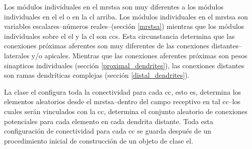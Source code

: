 \begin{figure}[h!]
    \label{fig:EncoderColumnConnections}
\end{figure}

Los módulos individuales en el \gls{mrstsa} son muy diferentes a los módulos individuales en el \gls{el} o en la \gls{cl} arriba. Los módulos individuales en el \gls{mrstsa} son variables escalares--números reales--(sección \ref{mrstsa}) mientras que los módulos individuales sobre el \gls{el} y la \gls{cl} son \glspl{cc}. Esta circunstancia determina que las conexiones próximas aferentes son muy diferentes de las conexiones distantes--laterales y/o apicales. Mientras que las conexiones aferentes próximas son pesos sinapticos individuales (sección \ref{proximal_dendrites}), las conexiones distantes son ramas dendríticas complejas (sección \ref{distal_dendrites}).


La clase \gls{el} configura toda la conectividad para cada \gls{cc}, esto es, determina los elementos aleatorios desde el \gls{mrstsa}--dentro del campo receptivo en tal \gls{cc}--los cuales serán vinculados con la \gls{cc}, determina el conjunto aleatorio de conexiones potenciales para cada elemento en cada dendrita distante. Toda esta configuración de conectividad para cada \gls{cc} se guarda después de un procedimiento inicial de construcción de un objeto de clase \gls{el}.

